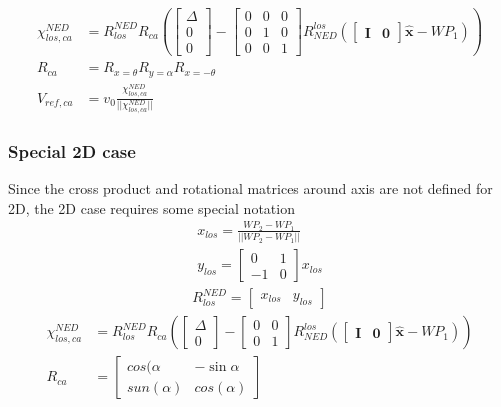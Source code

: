 \begin{align}
    \chi^{NED}_{los,ca} & = R^{NED}_{los}  R_{ca} \left(  \begin{bmatrix}\Delta \\ 0 \\ 0\end{bmatrix} - \begin{bmatrix} 0 & 0 & 0 \\ 0 & 1 & 0 \\ 0 & 0 & 1 \end{bmatrix} R^{los}_{NED} (\begin{bmatrix} \mathbf{I} & \mathbf{0} \end{bmatrix} \hat{\textbf{x}} - WP_1) \right) \label{chi^los_los,ca}\\
    R_{ca} & = R_{x=\theta} R_{y=\alpha} R_{x=-\theta} \label{R_ca} \\ 
    V_{ref,ca} & = v_0 \frac{\chi^{NED}_{los,ca} }{|| \chi^{NED}_{los,ca} ||} \label{V_ref,ca}
\end{align}


\subsubsection{Special 2D case}

Since the cross product and rotational matrices around axis are not defined for 2D, the 2D case requires some special notation
\begin{align}
    x_{los} = \frac{WP_2 - WP_1}{||WP_2 - WP_1||} \\
    y_{los} = \begin{bmatrix}0 & 1\\ -1 & 0 \end{bmatrix} x_{los}
\end{align}
\begin{align}
    R^{NED}_{los} = \begin{bmatrix} x_{los} & y_{los} \end{bmatrix}
\end{align}
\begin{align}
    \chi^{NED}_{los,ca} & = R^{NED}_{los}  R_{ca} \left(  \begin{bmatrix}\Delta \\ 0 \end{bmatrix} - \begin{bmatrix} 0 & 0  \\ 0 & 1  \end{bmatrix} R^{los}_{NED} (\begin{bmatrix} \mathbf{I} & \mathbf{0} \end{bmatrix} \hat{\textbf{x}} - WP_1) \right) \label{chi^los_los,ca}\\
    R_{ca} & = \begin{bmatrix}cos(\alpha & -\sin{\alpha}\\ sun(\alpha) & cos(\alpha) \end{bmatrix}
\end{align}

